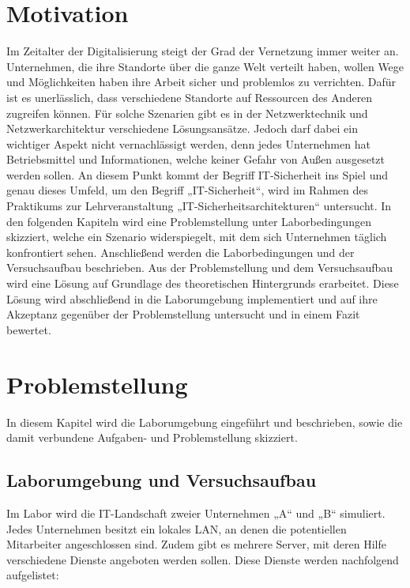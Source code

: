 \documentclass[
a4paper,     %
 headsepline, %
footsepline, %
titlepage,   %
 halfparskip,     %
 fleqn,       %
12pt         %
]{scrartcl}  %
\begin{document}
\section{Motivation}
Im Zeitalter der Digitalisierung steigt der Grad der Vernetzung immer weiter an. Unternehmen, die ihre Standorte über die ganze Welt verteilt haben, wollen Wege und Möglichkeiten haben ihre Arbeit sicher und problemlos zu verrichten. Dafür ist es unerlässlich, dass verschiedene Standorte auf Ressourcen des Anderen zugreifen können. Für solche Szenarien gibt es in der Netzwerktechnik und Netzwerkarchitektur verschiedene Lösungsansätze. 
Jedoch darf dabei ein wichtiger Aspekt nicht vernachlässigt werden, denn jedes Unternehmen hat Betriebsmittel und Informationen, welche keiner Gefahr von Außen ausgesetzt werden sollen. An diesem Punkt kommt der Begriff IT-Sicherheit ins Spiel und genau dieses Umfeld, um den Begriff „IT-Sicherheit“, wird im Rahmen des Praktikums zur Lehrveranstaltung „IT-Sicherheitsarchitekturen“ untersucht. 
In den folgenden Kapiteln wird eine Problemstellung unter Laborbedingungen skizziert, welche ein Szenario widerspiegelt, mit dem sich Unternehmen täglich konfrontiert sehen. Anschließend werden die Laborbedingungen und der Versuchsaufbau beschrieben. Aus der Problemstellung und dem Versuchsaufbau wird eine Lösung auf Grundlage des theoretischen Hintergrunds erarbeitet. Diese Lösung wird abschließend in die Laborumgebung implementiert und auf ihre Akzeptanz gegenüber der Problemstellung untersucht und in einem Fazit bewertet.   
\newpage
\section{Problemstellung}
In diesem Kapitel wird die Laborumgebung eingeführt und beschrieben, sowie die damit verbundene Aufgaben- und Problemstellung skizziert.
\subsection{Laborumgebung und Versuchsaufbau}
\label{laborumgebung}
Im Labor wird die IT-Landschaft zweier Unternehmen „A“ und „B“ simuliert. Jedes Unternehmen besitzt ein lokales LAN, an denen die potentiellen Mitarbeiter angeschlossen sind. Zudem gibt es mehrere Server, mit  deren Hilfe verschiedene Dienste angeboten werden sollen. 
Diese Dienste werden nachfolgend aufgelistet:
\end{document}
